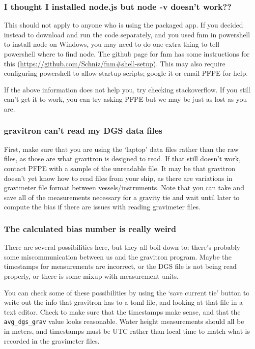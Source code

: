 \documentclass{pfpe-manual}
\begin{document}
\subsubsection{I thought I installed node.js but node -v doesn't work??}
This should not apply to anyone who is using the packaged app. If you decided instead to download and run the code separately, and you used fnm in powershell to install node on Windows, you may need to do one extra thing to tell powershell where to find node. The github page for fnm has some instructions for this (\url{https://github.com/Schniz/fnm#shell-setup}). This may also require configuring powershell to allow startup scripts; google it or email PFPE for help.

If the above information does not help you, try checking stackoverflow. If you still can't get it to work, you can try asking PFPE but we may be just as lost as you are.

\subsubsection{gravitron can't read my DGS data files}
First, make sure that you are using the `laptop' data files rather than the raw files, as those are what gravitron is designed to read. If that still doesn't work, contact PFPE with a sample of the unreadable file. It may be that gravitron doesn't yet know how to read files from your ship, as there are variations in gravimeter file format between vessels/instruments. Note that you can take and save all of the measurements necessary for a gravity tie and wait until later to compute the bias if there are issues with reading gravimeter files.

\subsubsection{The calculated bias number is really weird}
There are several possibilities here, but they all boil down to: there's probably some miscommunication between us and the gravitron program. Maybe the timestamps for measurements are incorrect, or the DGS file is not being read properly, or there is some mixup with measurement units. 

You can check some of these possibilities by using the `save current tie' button to write out the info that gravitron has to a toml file, and looking at that file in a text editor. Check to make sure that the timestamps make sense, and that the \texttt{avg\_dgs\_grav} value looks reasonable. Water height measurements should all be in meters, and timestamps must be UTC rather than local time to match what is recorded in the gravimeter files.
\end{document}
